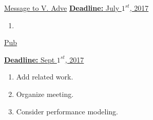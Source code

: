 \underline{Message to V. Adve} 
\underline{\textbf{Deadline:}  July $1^{st}$, 2017}
\begin{enumerate}
 \item \tiny
\end{enumerate}






\underline{Pub} 

\underline{\textbf{Deadline:}  Sept $1^{st}$, 2017}
\begin{enumerate}
\item \tiny Add related work. 
\item \tiny Organize meeting. 
\item \tiny Consider performance modeling. 
\end{enumerate}
